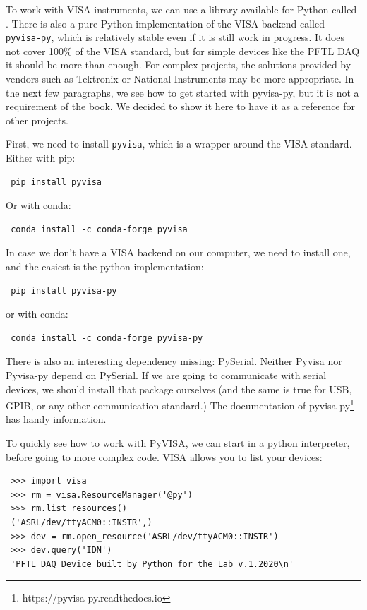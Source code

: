 To work with VISA instruments, we can use a library available for Python called . There is also a pure Python implementation of the VISA backend called \texttt{pyvisa-py}, which is relatively stable even if it is still work in progress. It does not cover 100\% of the VISA standard, but for simple devices like the {PFTL DAQ} it should be more than enough. For complex projects, the solutions provided by vendors such as Tektronix or National Instruments may be more appropriate. In the next few paragraphs, we see how to get started with pyvisa-py, but it is not a requirement of the book. We decided to show it here to have it as a reference for other projects.

First, we need to install \texttt{pyvisa}, which is a wrapper around the VISA standard. Either with pip:

\begin{verbatim}
 pip install pyvisa
\end{verbatim}

Or with conda:

\begin{verbatim}
 conda install -c conda-forge pyvisa
\end{verbatim}

In case we don't have a VISA backend on our computer, we need to install one, and the easiest is the python implementation:

\begin{verbatim}
 pip install pyvisa-py
\end{verbatim}

or with conda:

\begin{verbatim}
 conda install -c conda-forge pyvisa-py
\end{verbatim}

There is also an interesting dependency missing: PySerial. Neither Pyvisa nor Pyvisa-py depend on PySerial. If we are going to communicate with serial devices, we should install that package ourselves (and the same is true for USB, GPIB, or any other communication standard.) The documentation of pyvisa-py\footnote{https://pyvisa-py.readthedocs.io} has handy information.

To quickly see how to work with PyVISA, we can start in a python interpreter, before going to more complex code. VISA allows you to list your devices:

\begin{verbatim}
 >>> import visa
 >>> rm = visa.ResourceManager('@py')
 >>> rm.list_resources()
 ('ASRL/dev/ttyACM0::INSTR',)
 >>> dev = rm.open_resource('ASRL/dev/ttyACM0::INSTR')
 >>> dev.query('IDN')
 'PFTL DAQ Device built by Python for the Lab v.1.2020\n'
\end{verbatim}


